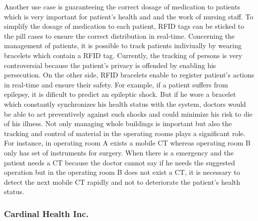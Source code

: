 Another use case is guaranteeing the correct dosage of medication to patients which is very important for patient's health and and the work of nursing staff. To simplify the dosage of medication to each patient, RFID tags can be sticked to the pill cases to ensure the correct distribution in real-time. 
Concerning the management of patients, it is possible to track patients indiviually by wearing bracelets which contain a RFID tag. Currently, the tracking of persons is very controversial because the patient's privacy is offended by enabling his persecution. On the other side, RFID bracelets enable to register patient's actions in real-time and ensure their safety. For example, if a patient suffers from epilepsy, it is dificult to predict an epileptic shock. But if he wore a bracelet which constantly synchronizes his health status with the system, doctors would be able to act preventively against such shocks and could minimize his risk to die of his illness.
Not only managing whole buildings is important but also the tracking and control of material in the operating rooms plays a significant role. For instance, in operating room A exists a mobile \ac{CT} whereas operating room B only has set of instruments for surgery. When there is a emergency and the patient needs a CT because the doctor cannot say if he needs the suggested operation but in the operating room B does not exist a CT, it is necessary to detect the next mobile CT rapidly and not to deteriorate the patient's health status. 

\subsubsection{Cardinal Health Inc.} \label{inventory}

